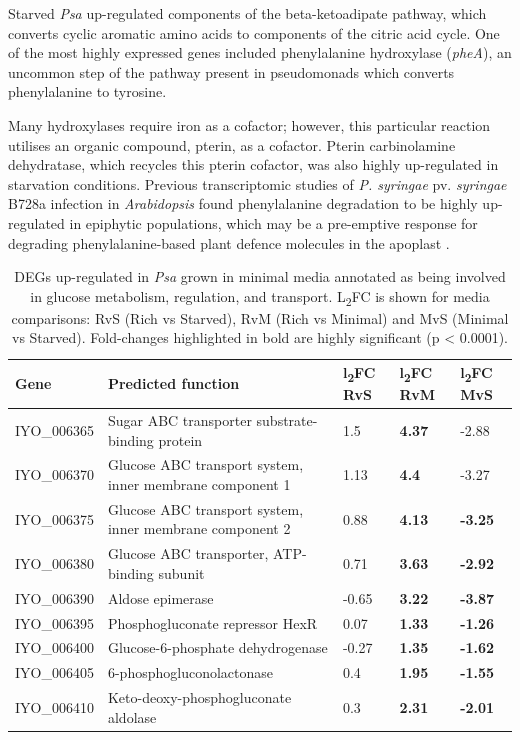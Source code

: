 Starved \textit{Psa} up-regulated components of the beta-ketoadipate pathway, which converts cyclic aromatic amino acids to components of the citric acid cycle. One of the most highly expressed genes included phenylalanine hydroxylase (\textit{pheA}), an uncommon step of the pathway present in pseudomonads which converts phenylalanine to tyrosine. 

Many hydroxylases require iron as a cofactor; however, this particular reaction utilises an organic compound, pterin, as a cofactor. Pterin carbinolamine dehydratase, which recycles this pterin cofactor, was also highly up-regulated in starvation conditions. Previous transcriptomic studies of \textit{P. syringae} pv. \textit{syringae} B728a infection in \textit{Arabidopsis} found phenylalanine degradation to be highly up-regulated in epiphytic populations, which may be a pre-emptive response for degrading phenylalanine-based plant defence molecules in the apoplast \citep{Yu-2013}. 
\newline
\begin{table}[H]
\footnotesize
    \centering
    \begin{tabular}{p{1.8cm}p{9cm}p{0.8cm}p{0.8cm}p{0.8cm}}\toprule
Gene & Predicted function & l\textsubscript{2}FC RvS  & l\textsubscript{2}FC RvM & l\textsubscript{2}FC MvS \\\midrule
IYO_006365 & Sugar ABC transporter substrate-binding protein & 1.5 & \textbf{4.37} & -2.88 \\
IYO_006370 & Glucose ABC transport system, inner membrane component 1 & 1.13 & \textbf{4.4} & -3.27\\
IYO_006375 & Glucose ABC transport system, inner membrane component 2 & 0.88 & \textbf{4.13} & \textbf{-3.25}\\
IYO_006380 & Glucose ABC transporter, ATP-binding subunit & 0.71 & 	\textbf{3.63}& \textbf{-2.92}\\
IYO_006390 & Aldose epimerase & -0.65 & \textbf{3.22} & \textbf{-3.87} \\
IYO_006395 & Phosphogluconate repressor HexR & 0.07 & \textbf{1.33} & \textbf{-1.26}\\
IYO_006400 & Glucose-6-phosphate dehydrogenase & -0.27 & \textbf{1.35} & \textbf{-1.62}\\
IYO_006405 & 6-phosphogluconolactonase & 0.4 & \textbf{1.95} & \textbf{-1.55}\\
IYO_006410 & Keto-deoxy-phosphogluconate aldolase & 0.3 & \textbf{2.31} & \textbf{-2.01}\\
\bottomrule
    \end{tabular}
    \caption[DEGs involved in glucose uptake and metabolism up-regulated in \textit{Psa} grown in minimal media]{DEGs up-regulated in \textit{Psa} grown in minimal media annotated as being involved in glucose metabolism, regulation, and transport.  L\textsubscript{2}FC is shown for media comparisons: RvS (Rich vs Starved), RvM (Rich vs Minimal) and MvS (Minimal vs Starved). Fold-changes highlighted in bold are highly significant (p < 0.0001).}
    \label{tab:min_glucose}
\end{table}

